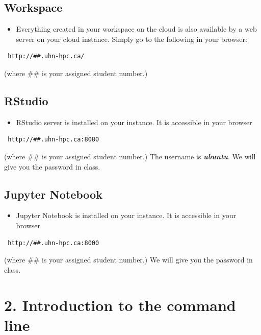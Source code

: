 \documentclass[
]{book}
\providecommand{\tightlist}{%
  \setlength{\itemsep}{0pt}\setlength{\parskip}{0pt}}
\begin{document}
\section{Workspace}\label{workspace}

\begin{itemize}
\tightlist
\item
  Everything created in your workspace on the cloud is also available by a web server on your cloud instance. Simply go to the following in your browser:
\end{itemize}

\begin{verbatim}
 http://##.uhn-hpc.ca/
\end{verbatim}

(where \#\# is your assigned student number.)

\section{RStudio}\label{rstudio}

\begin{itemize}
\tightlist
\item
  RStudio server is installed on your instance. It is accessible in your browser
\end{itemize}

\begin{verbatim}
 http://##.uhn-hpc.ca:8080
\end{verbatim}

(where \#\# is your assigned student number.) The username is \textbf{\emph{ubuntu}}. We will give you the password in class.

\section{Jupyter Notebook}\label{jupyter-notebook}

\begin{itemize}
\tightlist
\item
  Jupyter Notebook is installed on your instance. It is accessible in your browser
\end{itemize}

\begin{verbatim}
 http://##.uhn-hpc.ca:8000
\end{verbatim}

(where \#\# is your assigned student number.) We will give you the password in class.

\chapter{2. Introduction to the command line}\label{introduction-to-the-command-line}
\end{document}
